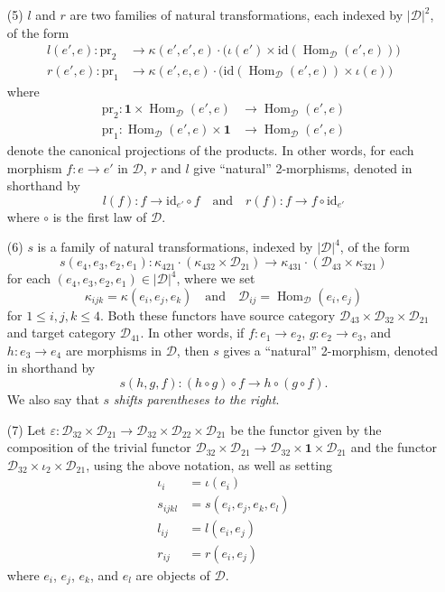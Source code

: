 \documentclass[fleqn]{article}
\newcommand{\oldpage}[1]{\marginpar{\footnotesize$\Big\vert$ \textit{p.~#1}}}
\newcommand{\id}{\mathrm{id}}
\newcommand{\textand}{\quad\text{and}\quad}
\newcommand{\pr}{\mathrm{pr}}
\newcommand{\cat}[1]{\mathcal{#1}}
\newcommand{\set}[1]{|#1|}
\DeclareMathOperator{\Hom}{Hom}
\begin{document}
\begin{enumerate}
  \item[(5)]
    \oldpage{244}
    $l$ and $r$ are two families of natural transformations, each indexed by $\set{\cat{D}}^2$, of the form
    \[
      \begin{aligned}
        l(e',e)\colon \pr_2
      & \to \kappa(e',e',e)\cdot\big(\iota(e')\times\id(\Hom_\cat{D}(e',e))\big)
      \\r(e',e)\colon \pr_1
      & \to \kappa(e',e,e)\cdot\big(\id(\Hom_\cat{D}(e',e))\times\iota(e)\big)
      \end{aligned}
    \]
    where
    \[
      \begin{aligned}
        \pr_2\colon \mathbf{1}\times\Hom_\cat{D}(e',e)
      & \to \Hom_\cat{D}(e',e)
      \\\pr_1\colon \Hom_\cat{D}(e',e)\times\mathbf{1}
      & \to \Hom_\cat{D}(e',e)
      \end{aligned}
    \]
    denote the canonical projections of the products.
    In other words, for each morphism $f\colon e\to e'$ in $\cat{D}$, $r$ and $l$ give ``natural'' 2-morphisms, denoted in shorthand by
    \[
      l(f)\colon f\to\id_{e'}\circ f
      \textand
      r(f)\colon f\to f\circ\id_{e'}
    \]
    where $\circ$ is the first law of $\cat{D}$.

  \item[(6)]
    $s$ is a family of natural transformations, indexed by $\set{\cat{D}}^4$, of the form
    \[
      s(e_4,e_3,e_2,e_1)\colon
      \kappa_{421}\cdot(\kappa_{432}\times\cat{D}_{21})
      \to \kappa_{431}\cdot(\cat{D}_{43}\times\kappa_{321})
    \]
    for each $(e_4,e_3,e_2,e_1)\in\set{\cat{D}}^4$, where we set
    \[
      \kappa_{ijk} = \kappa(e_i,e_j,e_k)
      \textand
      \cat{D}_{ij} = \Hom_\cat{D}(e_i,e_j)
    \]
    for $1\leqslant i,j,k\leqslant 4$.
    Both these functors have source category $\cat{D}_{43}\times\cat{D}_{32}\times\cat{D}_{21}$ and target category $\cat{D}_{41}$.
    In other words, if $f\colon e_1\to e_2$, $g\colon e_2\to e_3$, and $h\colon e_3\to e_4$ are morphisms in $\cat{D}$, then $s$ gives a ``natural'' 2-morphism, denoted in shorthand by
    \[
      s(h,g,f)\colon (h\circ g)\circ f
      \to h\circ(g\circ f).
    \]
    We also say that $s$ \emph{shifts parentheses to the right}.

  \item[(7)]
    Let $\varepsilon\colon\cat{D}_{32}\times\cat{D}_{21}\to\cat{D}_{32}\times\cat{D}_{22}\times\cat{D}_{21}$ be the functor given by the composition of the trivial functor $\cat{D}_{32}\times\cat{D}_{21}\to\cat{D}_{32}\times\mathbf{1}\times\cat{D}_{21}$ and the functor $\cat{D}_{32}\times\iota_2\times\cat{D}_{21}$, using the above notation, as well as setting
    \[
      \begin{aligned}
        \iota_i
      & = \iota(e_i)
      \\s_{ijkl}
      & = s(e_i,e_j,e_k,e_l)
      \\l_{ij}
      & = l(e_i,e_j)
      \\r_{ij}
      & = r(e_i,e_j)
      \end{aligned}
    \]
    where $e_i$, $e_j$, $e_k$, and $e_l$ are objects of $\cat{D}$.


\end{enumerate}
\end{document}
